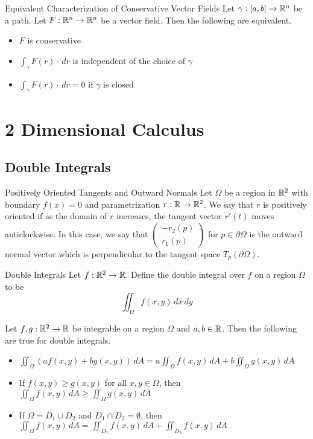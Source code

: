 \documentclass[a4paper]{article}
\begin{document}
\begin{thm}{Equivalent Characterization of Conservative Vector Fields}{} Let $\gamma:[a,b]\to\mathbb{R}^n$ be a path. Let $F:\mathbb{R}^n\to\mathbb{R}^n$ be a vector field. Then the following are equivalent. 
\begin{itemize}
\item $F$ is conservative
\item $\int_\gamma F(r)\cdot \,dr$ is independent of the choice of $\gamma$
\item $\int_\gamma F(r)\cdot \,dr=0$ if $\gamma$ is closed
\end{itemize}
\end{thm}

\pagebreak

\section{2 Dimensional Calculus}
\subsection{Double Integrals}
\begin{defn}{Positively Oriented Tangents and Outward Normals}{} Let $\Omega$ be a region in $\mathbb{R}^2$ with boundary $f(x)=0$ and parametrization $r:\mathbb{R}\to\mathbb{R}^2$. We say that $r$ is positively oriented if as the domain of $r$ increases, the tangent vector $r'(t)$ moves anticlockwise. In this case, we say that $\begin{pmatrix}-r_2(p)\\r_1(p)\end{pmatrix}$ for $p\in\partial\Omega$ is the outward normal vector which is perpendicular to the tangent space $T_p(\partial\Omega)$. 
\end{defn}

\begin{defn}{Double Integrals}{} Let $f:\mathbb{R}^2\to\mathbb{R}$. Define the double integral over $f$ on a region $\Omega$ to be $$\iint_\Omega f(x,y)\,dx\,dy$$
\end{defn}

\begin{prp}{}{} Let $f,g:\mathbb{R}^2\to\mathbb{R}$ be integrable on a region $\Omega$ and $a,b\in\mathbb{R}$. Then the following are true for double integrals. 
\begin{itemize}
\item $\iint_\Omega(af(x,y)+bg(x,y))\,dA=a\iint_\Omega f(x,y)\,dA+b\iint_\Omega g(x,y)\,dA$
\item If $f(x,y)\geq g(x,y)$ for all $x,y\in\Omega$, then $\iint_\Omega f(x,y)\,dA\geq\iint_\Omega g(x,y)\,dA$
\item If $\Omega=D_1\cup D_2$ and $D_1\cap D_2=\emptyset$, then $\iint_\Omega f(x,y)\,dA=\iint_{D_1}f(x,y)\,dA+\iint_{D_2}f(x,y)\,dA$
\end{itemize}
\end{prp}
\end{document}
